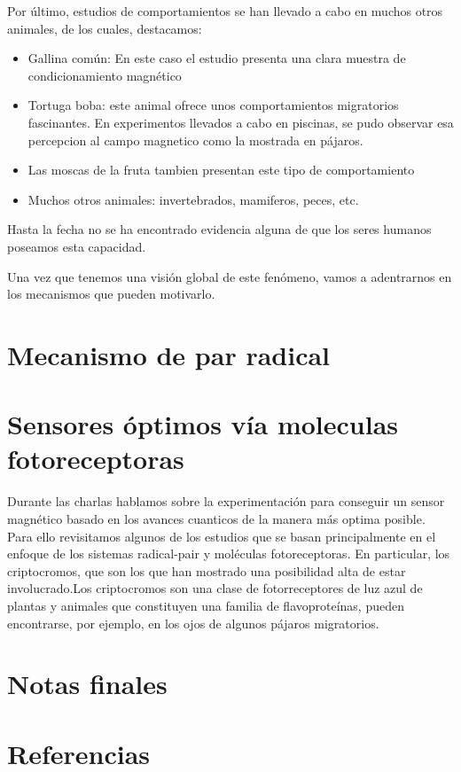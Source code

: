 \documentclass[1p]{elsarticle}
\begin{document}
Por último, estudios de comportamientos se han llevado a cabo en muchos otros animales, de los cuales, destacamos: 
\begin{itemize}
	\item Gallina común: En este caso el estudio presenta una clara muestra de condicionamiento magnético
	\item Tortuga boba: este animal ofrece unos comportamientos migratorios fascinantes. En experimentos llevados a cabo en piscinas, se pudo observar esa percepcion al campo magnetico como la mostrada en pájaros.
	\item Las moscas de la fruta tambien presentan este tipo de comportamiento
	\item Muchos otros animales: invertebrados, mamiferos, peces, etc.
\end{itemize}

Hasta la fecha no se ha encontrado evidencia alguna de que los seres humanos poseamos esta capacidad.

Una vez que tenemos una visión global de este fenómeno, vamos a adentrarnos en los mecanismos que pueden motivarlo.


\section{Mecanismo de par radical}





\section{Sensores óptimos vía moleculas fotoreceptoras}
Durante las charlas hablamos sobre la experimentación para conseguir un sensor magnético basado en los avances cuanticos de la manera más optima posible. 
Para ello revisitamos algunos de los estudios que se basan principalmente en el enfoque de los sistemas radical-pair y moléculas fotoreceptoras. En particular, los criptocromos, que son los que han mostrado una posibilidad alta de estar involucrado.Los criptocromos son una clase de fotorreceptores de luz azul de plantas y animales que constituyen una familia de flavoproteínas, pueden encontrarse, por ejemplo, en los ojos de algunos pájaros migratorios.










\section{Notas finales}


\section*{Referencias}


\end{document}

